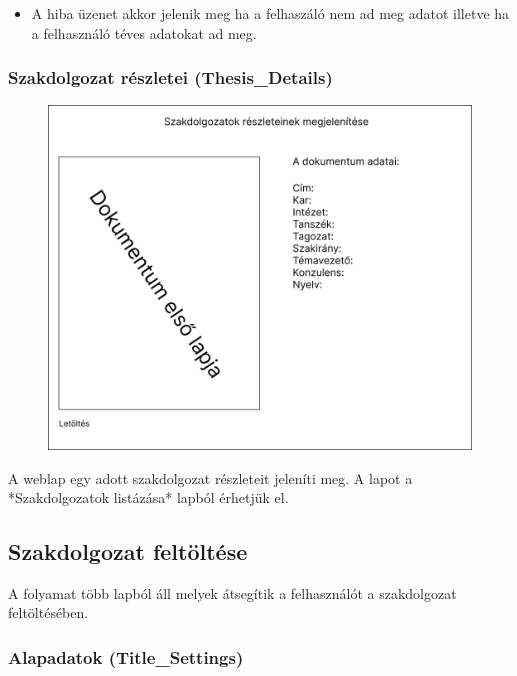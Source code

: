 \documentclass[a4paper,12pt]{article}
\begin{document}
\begin{itemize}
	\item A hiba üzenet akkor jelenik meg ha a felhaszáló nem ad meg adatot illetve ha a felhasználó téves adatokat ad meg.
\end{itemize}

\subsubsection{Szakdolgozat részletei (Thesis\_Details)}

\begin{figure}
	\centering
	\includegraphics[width=\textwidth]{images/Web_pages/Thesis_Details.jpg}
	\caption{}
	\label{fig:Thesis_Details}
\end{figure}

A weblap egy adott szakdolgozat részleteit jeleníti meg. A lapot a *Szakdolgozatok listázása* lapból érhetjük el. 

\subsection{Szakdolgozat feltöltése}

A folyamat több lapból áll melyek átsegítik a felhasználót a szakdolgozat feltöltésében.

\subsubsection{Alapadatok (Title\_Settings)}
\end{document}

